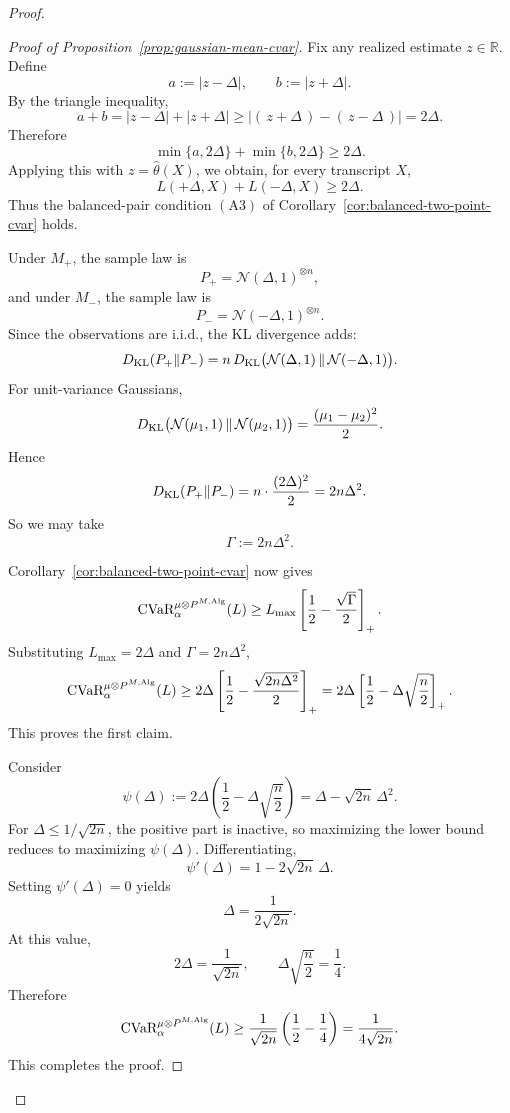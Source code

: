 \documentclass[conference]{IEEEtran}
\begin{document}
\begin{proof}[Proof]
\begin{proof}[Proof of Proposition~\ref{prop:gaussian-mean-cvar}]
\medskip
\noindent
{}
Fix any realized estimate \(z\in\mathbb{R}\). Define
\[
a:=|z-\Delta|,
\qquad
b:=|z+\Delta|.
\]
By the triangle inequality,
\[
a+b = |z-\Delta|+|z+\Delta| \ge |(\,z+\Delta\,)-(\,z-\Delta\,)|=2\Delta.
\]
Therefore
\[
\min\{a,2\Delta\}+\min\{b,2\Delta\}\ge 2\Delta.
\]
Applying this with \(z=\widehat{\theta}(X)\), we obtain, for every transcript \(X\),
\[
L(+\Delta,X)+L(-\Delta,X)\ge 2\Delta.
\]
Thus the balanced-pair condition \((\mathrm{A3})\) of Corollary~\ref{cor:balanced-two-point-cvar} holds.

\medskip
\noindent
{}
Under \(M_+\), the sample law is
\[
P_+ = \mathcal{N}(\Delta,1)^{\otimes n},
\]
and under \(M_-\), the sample law is
\[
P_- = \mathcal{N}(-\Delta,1)^{\otimes n}.
\]
Since the observations are i.i.d., the KL divergence adds:
\[
D_{\textup{KL}}(P_+\|P_-)
=
n\,D_{\textup{KL}}\bigl(\mathcal{N}(\Delta,1)\,\|\,\mathcal{N}(-\Delta,1)\bigr).
\]
For unit-variance Gaussians,
\[
D_{\textup{KL}}\bigl(\mathcal{N}(\mu_1,1)\,\|\,\mathcal{N}(\mu_2,1)\bigr)
=
\frac{(\mu_1-\mu_2)^2}{2}.
\]
Hence
\[
D_{\textup{KL}}(P_+\|P_-)
=
n\cdot \frac{(2\Delta)^2}{2}
=
2n\Delta^2.
\]
So we may take
\[
\Gamma:=2n\Delta^2.
\]

\medskip
\noindent
{}
Corollary~\ref{cor:balanced-two-point-cvar} now gives
\[
\textup{CVaR}_\alpha^{\mu\otimes P^{M,\textup{Alg}}}(L)
\ge
L_{\max}\left[\frac12-\frac{\sqrt{\Gamma}}{2}\right]_+.
\]
Substituting \(L_{\max}=2\Delta\) and \(\Gamma=2n\Delta^2\),
\[
\textup{CVaR}_\alpha^{\mu\otimes P^{M,\textup{Alg}}}(L)
\ge
2\Delta\left[\frac12-\frac{\sqrt{2n\Delta^2}}{2}\right]_+
=
2\Delta\left[\frac12-\Delta\sqrt{\frac{n}{2}}\right]_+.
\]
This proves the first claim.

\medskip
\noindent
{}
Consider
\[
\psi(\Delta):=
2\Delta\left(\frac12-\Delta\sqrt{\frac{n}{2}}\right)
=
\Delta-\sqrt{2n}\,\Delta^2.
\]
For \(\Delta\le 1/\sqrt{2n}\), the positive part is inactive, so maximizing the lower bound reduces to maximizing \(\psi(\Delta)\). Differentiating,
\[
\psi'(\Delta)=1-2\sqrt{2n}\,\Delta.
\]
Setting \(\psi'(\Delta)=0\) yields
\[
\Delta=\frac{1}{2\sqrt{2n}}.
\]
At this value,
\[
2\Delta=\frac{1}{\sqrt{2n}},
\qquad
\Delta\sqrt{\frac{n}{2}}=\frac14.
\]
Therefore
\[
\textup{CVaR}_\alpha^{\mu\otimes P^{M,\textup{Alg}}}(L)
\ge
\frac{1}{\sqrt{2n}}\left(\frac12-\frac14\right)
=
\frac{1}{4\sqrt{2n}}.
\]
This completes the proof.
\end{proof}


\end{proof}
\end{document}

